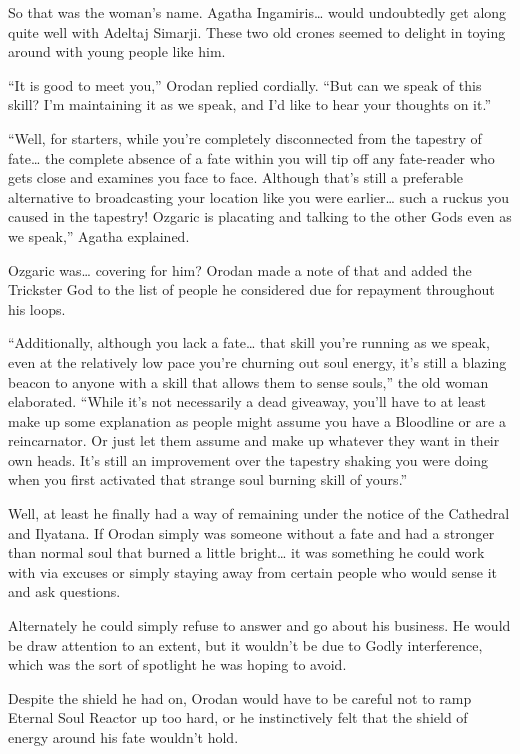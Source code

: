 \documentclass[a4paper,10pt]{book}
\begin{document}
So that was the woman’s name. Agatha Ingamiris… would undoubtedly get along quite well with Adeltaj Simarji. These two old crones seemed to delight in toying around with young people like him.\par
“It is good to meet you,” Orodan replied cordially. “But can we speak of this skill? I’m maintaining it as we speak, and I’d like to hear your thoughts on it.”\par
“Well, for starters, while you’re completely disconnected from the tapestry of fate… the complete absence of a fate within you will tip off any fate-reader who gets close and examines you face to face. Although that’s still a preferable alternative to broadcasting your location like you were earlier… such a ruckus you caused in the tapestry! Ozgaric is placating and talking to the other Gods even as we speak,” Agatha explained.\par
Ozgaric was… covering for him? Orodan made a note of that and added the Trickster God to the list of people he considered due for repayment throughout his loops.\par
“Additionally, although you lack a fate… that skill you’re running as we speak, even at the relatively low pace you’re churning out soul energy, it’s still a blazing beacon to anyone with a skill that allows them to sense souls,” the old woman elaborated. “While it’s not necessarily a dead giveaway, you’ll have to at least make up some explanation as people might assume you have a Bloodline or are a reincarnator. Or just let them assume and make up whatever they want in their own heads. It’s still an improvement over the tapestry shaking you were doing when you first activated that strange soul burning skill of yours.”\par
Well, at least he finally had a way of remaining under the notice of the Cathedral and Ilyatana. If Orodan simply was someone without a fate and had a stronger than normal soul that burned a little bright… it was something he could work with via excuses or simply staying away from certain people who would sense it and ask questions.\par
Alternately he could simply refuse to answer and go about his business. He would be draw attention to an extent, but it wouldn’t be due to Godly interference, which was the sort of spotlight he was hoping to avoid.\par
Despite the shield he had on, Orodan would have to be careful not to ramp Eternal Soul Reactor up too hard, or he instinctively felt that the shield of energy around his fate wouldn’t hold.\par
\end{document}
